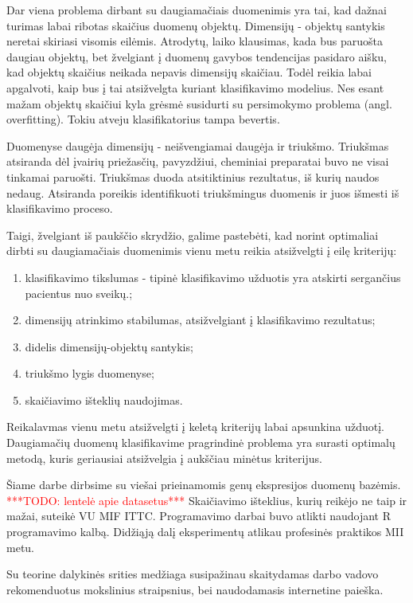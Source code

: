 Dar viena problema dirbant su daugiamačiais duomenimis yra tai, kad dažnai
turimas labai ribotas skaičius duomenų objektų. Dimensijų - objektų santykis 
neretai skiriasi visomis eilėmis. Atrodytų, laiko klausimas, kada bus paruošta
daugiau objektų, bet žvelgiant į duomenų gavybos tendencijas pasidaro aišku, kad
objektų skaičius neikada nepavis dimensijų skaičiau. Todėl reikia labai apgalvoti,
kaip bus į tai atsižvelgta kuriant klasifikavimo modelius. Nes esant mažam
objektų skaičiui kyla grėsmė susidurti su persimokymo problema (angl. 
overfitting). Tokiu atveju klasifikatorius tampa bevertis.

Duomenyse daugėja dimensijų - neišvengiamai daugėja ir triukšmo. Triukšmas atsiranda
dėl įvairių priežasčių, pavyzdžiui, cheminiai preparatai buvo ne visai tinkamai
paruošti. Triukšmas duoda atsitiktinius rezultatus, iš kurių naudos nedaug.
Atsiranda poreikis identifikuoti triukšmingus duomenis ir juos išmesti iš 
klasifikavimo proceso.

Taigi, žvelgiant iš paukščio skrydžio, galime pastebėti, kad norint optimaliai
dirbti su daugiamačiais duomenimis vienu metu reikia atsižvelgti į eilę kriterijų:
\begin{enumerate}
 \item klasifikavimo tikslumas - tipinė klasifikavimo užduotis yra atskirti
 sergančius pacientus nuo sveikų.;
 \item dimensijų atrinkimo stabilumas, atsižvelgiant į klasifikavimo rezultatus;
 \item didelis dimensijų-objektų santykis;
 \item triukšmo lygis duomenyse;
 \item skaičiavimo išteklių naudojimas.
\end{enumerate}
Reikalavmas vienu metu atsižvelgti į keletą kriterijų labai apsunkina užduotį.
Daugiamačių duomenų klasifikavime pragrindinė problema yra surasti optimalų 
metodą, kuris geriausiai atsižvelgia į aukščiau minėtus kriterijus.

Šiame darbe dirbsime su viešai prieinamomis genų ekspresijos duomenų bazėmis.
\textcolor{red}{***TODO: lentelė apie datasetus***}
Skaičiavimo išteklius, kurių reikėjo ne taip ir mažai, suteikė VU MIF ITTC.
Programavimo darbai buvo atlikti naudojant R programavimo kalbą. Didžiąją
dalį eksperimentų atlikau profesinės praktikos MII metu.

Su teorine dalykinės srities medžiaga susipažinau skaitydamas darbo vadovo 
rekomenduotus mokslinius straipsnius, bei naudodamasis internetine paieška.

